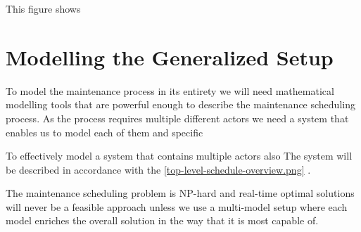 This figure shows 



\chapter{Modelling the Generalized Setup}
To model the maintenance process in its entirety we will need mathematical modelling tools that are powerful enough to describe the maintenance
scheduling process. As the process requires multiple different actors we need a system that enables us to model each of them and specific   

To effectively model a system that contains multiple actors also 
The system will be described in accordance 
with the \ref{top-level-schedule-overview.png} \cite{palmer_maintenance_2019}.

The maintenance scheduling problem is NP-hard and real-time optimal solutions will never be a feasible approach unless we use a multi-model setup where each model enriches the 
overall solution in the way that it is most capable of. 

